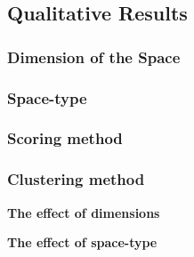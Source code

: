 
\subsection{Qualitative Results}

\subsubsection{Dimension of the Space}

\subsubsection{Space-type}

\subsubsection{Scoring method}

\subsubsection{Clustering method}

\textbf{The effect of dimensions}


\textbf{The effect of space-type}


